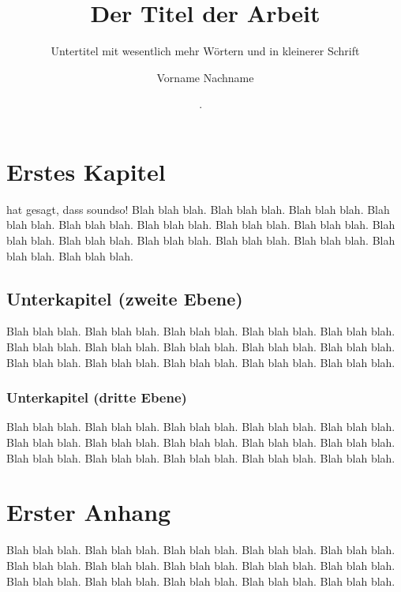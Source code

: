 \documentclass[12pt,a4paper,parskip=half]{scrartcl}
\begin{document}
  \title{Der Titel der Arbeit}
  \subtitle{Untertitel mit wesentlich mehr Wörtern und in kleinerer Schrift}
  \author{Vorname Nachname}
  \date{\the\day. \monthnamengerman\ \the\year}
  \makeheader


\section{Erstes Kapitel}

\cite{author_title_year} hat gesagt, dass soundso! Blah blah blah. Blah blah blah. Blah blah blah. Blah blah blah. Blah blah blah. Blah blah blah. Blah blah blah. Blah blah blah. Blah blah blah. Blah blah blah. Blah blah blah. Blah blah blah. Blah blah blah. Blah blah blah. Blah blah blah. 

\subsection{Unterkapitel (zweite Ebene)}

Blah blah blah. Blah blah blah. Blah blah blah. Blah blah blah. Blah blah blah. Blah blah blah. Blah blah blah. Blah blah blah. Blah blah blah. Blah blah blah. Blah blah blah. Blah blah blah. Blah blah blah. Blah blah blah. Blah blah blah. 

\subsubsection{Unterkapitel (dritte Ebene)}

Blah blah blah. Blah blah blah. Blah blah blah. Blah blah blah. Blah blah blah. Blah blah blah. Blah blah blah. Blah blah blah. Blah blah blah. Blah blah blah. Blah blah blah. Blah blah blah. Blah blah blah. Blah blah blah. Blah blah blah. 

\makeworkscited

\appendix

\section{Erster Anhang}

Blah blah blah. Blah blah blah. Blah blah blah. Blah blah blah. Blah blah blah. Blah blah blah. Blah blah blah. Blah blah blah. Blah blah blah. Blah blah blah. Blah blah blah. Blah blah blah. Blah blah blah. Blah blah blah. Blah blah blah. 
\end{document}
